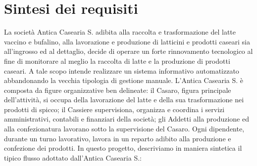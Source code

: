 \documentclass[12pt]{report}
\begin{document}
\section{Sintesi dei requisiti}
La società Antica Casearia S. adibita alla raccolta e trasformazione del latte vaccino e bufalino, alla lavorazione e produzione di latticini e prodotti caseari sia all'ingrosso ed al dettaglio, decide di operare un forte rinnovamento tecnologico al fine di monitorare al meglio la raccolta di latte e la produzione di prodotti caseari. A tale scopo intende realizzare un sistema informativo automatizzato abbandonando la vecchia tipologia di gestione manuale. L'Antica Casearia S. è composta da figure organizzative ben delineate: il Casaro, figura principale dell'attività, si occupa della lavorazione del latte e della sua trasformazione nei prodotti di spicco; il Cassiere supervisiona, organizza e coordina i servizi amministrativi, contabili e finanziari della società; gli Addetti alla produzione ed alla confezionatura lavorano sotto la supervisione del Casaro. Ogni dipendente, durante un turno lavorativo, lavora in un reparto adibito alla produzione e confezione dei prodotti. In questo progetto, descriviamo in maniera sintetica il tipico flusso adottato dall'Antica Casearia S.:
\end{document}
